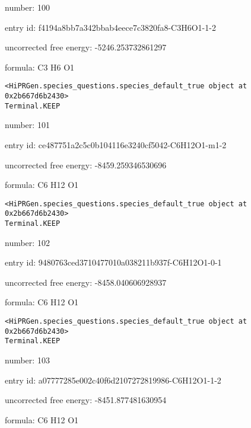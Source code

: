 \documentclass{article}
\begin{document}
number: 100



entry id: f4194a8bb7a342bbab4eece7c3820fa8-C3H6O1-1-2



uncorrected free energy: -5246.253732861297



formula: C3 H6 O1


\vspace{1cm}
\begin{verbatim}
<HiPRGen.species_questions.species_default_true object at 0x2b667d6b2430>
Terminal.KEEP
\end{verbatim}


number: 101



entry id: ce487751a2c5c0b104116e3240cf5042-C6H12O1-m1-2



uncorrected free energy: -8459.259346530696



formula: C6 H12 O1


\vspace{1cm}
\begin{verbatim}
<HiPRGen.species_questions.species_default_true object at 0x2b667d6b2430>
Terminal.KEEP
\end{verbatim}


number: 102



entry id: 9480763ced3710477010a038211b937f-C6H12O1-0-1



uncorrected free energy: -8458.040606928937



formula: C6 H12 O1


\vspace{1cm}
\begin{verbatim}
<HiPRGen.species_questions.species_default_true object at 0x2b667d6b2430>
Terminal.KEEP
\end{verbatim}


number: 103



entry id: a07777285e002c40f6d2107272819986-C6H12O1-1-2



uncorrected free energy: -8451.877481630954



formula: C6 H12 O1


\vspace{1cm}
\end{document}
